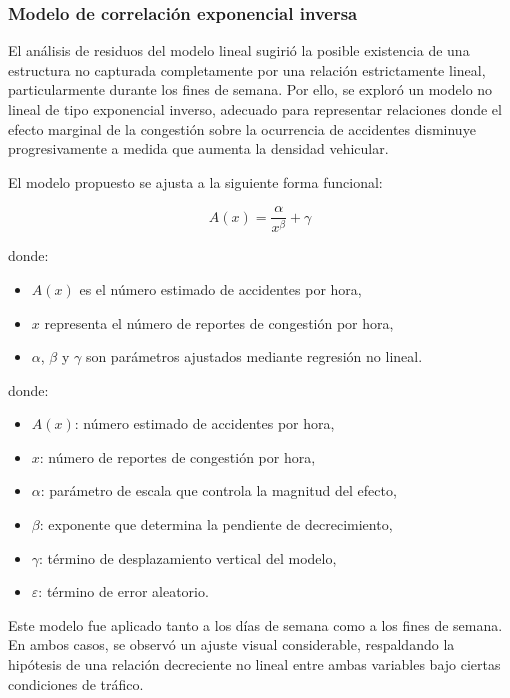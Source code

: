 \documentclass[12pt]{article}
\begin{document}
\subsubsection{Modelo de correlación exponencial inversa}

El análisis de residuos del modelo lineal sugirió la posible existencia de una estructura no capturada completamente por una relación estrictamente lineal,
particularmente durante los fines de semana.
Por ello, se exploró un modelo no lineal de tipo exponencial inverso, adecuado para representar relaciones donde el efecto marginal de la congestión sobre la ocurrencia de accidentes disminuye progresivamente a medida que aumenta la densidad vehicular.

El modelo propuesto se ajusta a la siguiente forma funcional:

\begin{equation}
A(x) = \frac{\alpha}{x^{\beta}} + \gamma
\end{equation}

donde:
\begin{itemize}
    \item $A(x)$ es el número estimado de accidentes por hora,
    \item $x$ representa el número de reportes de congestión por hora,
    \item $\alpha$, $\beta$ y $\gamma$ son parámetros ajustados mediante regresión no lineal.
\end{itemize}

donde:
\begin{itemize}
    \item \(A(x)\): número estimado de accidentes por hora,
    \item \(x\): número de reportes de congestión por hora,
    \item \(\alpha\): parámetro de escala que controla la magnitud del efecto,
    \item \(\beta\): exponente que determina la pendiente de decrecimiento,
    \item \(\gamma\): término de desplazamiento vertical del modelo,
    \item \(\varepsilon\): término de error aleatorio.
\end{itemize}

Este modelo fue aplicado tanto a los días de semana como a los fines de semana. En ambos casos, se observó un ajuste visual considerable, respaldando la hipótesis de una relación decreciente no lineal entre ambas variables bajo ciertas condiciones de tráfico.
\end{document}
